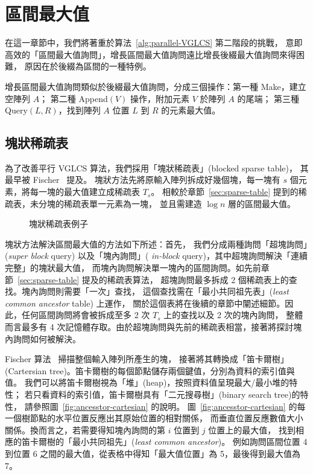 \section{區間最大值} \label{sec:parallelRMQ}

在這一章節中，我們將著重於算法~\ref{alg:parallel-VGLCS} 第二階段的挑戰，
意即高效的「區間最大值詢問」，增長區間最大值詢問遠比增長後綴最大值詢問來得困難，
原因在於後綴為區間的一種特例。

增長區間最大值詢問類似於後綴最大值詢問，分成三個操作：第一種 {\sc Make}，建立空陣列 $A$；
第二種 {\sc Append}$(V)$ 操作，附加元素 $V$ 於陣列 $A$ 的尾端；
第三種 {\sc Query}$(L, R)$，找到陣列 $A$ 位置 $L$ 到 $R$ 的元素最大值。

\subsection{塊狀稀疏表} \label{sec:blocked-sparse-table}

為了改善平行 VGLCS 算法，我們採用「塊狀稀疏表」(blocked sparse table)，
其最早被 Fischer~\cite{Fischer2006TheoreticalAP} 提及。
塊狀方法先將原輸入陣列拆成好幾個塊，每一塊有 $s$ 個元素，將每一塊的最大值建立成稀疏表 $T_s$。
相較於章節~\ref{sec:sparse-table} 提到的稀疏表，未分塊的稀疏表單一元素為一塊，
並且需建造 $\log n$ 層的區間最大值。


\begin{figure}[!thb]
  \centering {} 
  \caption{塊狀稀疏表例子}
  \label{fig:block-interval-decomposition}
\end{figure}

塊狀方法解決區間最大值的方法如下所述：首先，
我們分成兩種詢問「超塊詢問」({\em super block} query) 以及「塊內詢問」({\em
  in-block} query)，其中超塊詢問解決「連續完整」的塊狀最大值，
而塊內詢問解決單一塊內的區間詢問。如先前章節~\ref{sec:sparse-table} 提及的稀疏表算法，
超塊詢問最多拆成 2 個稀疏表上的查找。塊內詢問則需要「一次」查找，
這個查找需在「最小共同祖先表」({\em least common ancestor} table) 上運作，
關於這個表將在後續的章節中闡述細節。因此，任何區間詢問將會被拆成至多 2 次 $T_s$ 上的查找以及 2 次的塊內詢問，
整體而言最多有 4 次記憶體存取。由於超塊詢問與先前的稀疏表相當，接著將探討塊內詢問如何被解決。

Fischer 算法~\cite{Fischer2006TheoreticalAP} 掃描整個輸入陣列所產生的塊，
接著將其轉換成「笛卡爾樹」(Cartersian tree)。笛卡爾樹的每個節點儲存兩個鍵值，分別為資料的索引值與值。
我們可以將笛卡爾樹視為「堆」(heap)，按照資料值呈現最大/最小堆的特性；
若只看資料的索引值，笛卡爾樹具有「二元搜尋樹」(binary search tree)的特性，
請參照圖~\ref{fig:ancesstor-cartesian} 的說明。
圖~\ref{fig:ancesstor-cartesian} 的每一個樹節點的水平位置反應出其原始位置的相對關係，
而垂直位置反應數值大小關係。換而言之，若需要得知塊內詢問的第 $i$ 位置到 $j$ 位置上的最大值，
找到相應的笛卡爾樹的「最小共同祖先」({\em least common ancestor})。
例如詢問區間位置 4 到位置 6 之間的最大值，從表格中得知「最大值位置」為 5，最後得到最大值為 7。

